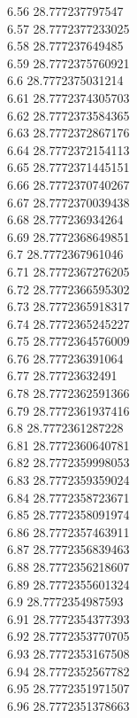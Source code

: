 {6.56	28.777237797547\\
6.57	28.7772377233025\\
6.58	28.777237649485\\
6.59	28.7772375760921\\
6.6	28.7772375031214\\
6.61	28.7772374305703\\
6.62	28.7772373584365\\
6.63	28.7772372867176\\
6.64	28.7772372154113\\
6.65	28.7772371445151\\
6.66	28.7772370740267\\
6.67	28.7772370039438\\
6.68	28.777236934264\\
6.69	28.7772368649851\\
6.7	28.7772367961046\\
6.71	28.7772367276205\\
6.72	28.7772366595302\\
6.73	28.7772365918317\\
6.74	28.7772365245227\\
6.75	28.7772364576009\\
6.76	28.777236391064\\
6.77	28.77723632491\\
6.78	28.7772362591366\\
6.79	28.7772361937416\\
6.8	28.7772361287228\\
6.81	28.7772360640781\\
6.82	28.7772359998053\\
6.83	28.7772359359024\\
6.84	28.7772358723671\\
6.85	28.7772358091974\\
6.86	28.7772357463911\\
6.87	28.7772356839463\\
6.88	28.7772356218607\\
6.89	28.7772355601324\\
6.9	28.7772354987593\\
6.91	28.7772354377393\\
6.92	28.7772353770705\\
6.93	28.7772353167508\\
6.94	28.7772352567782\\
6.95	28.7772351971507\\
6.96	28.7772351378663\\
}

